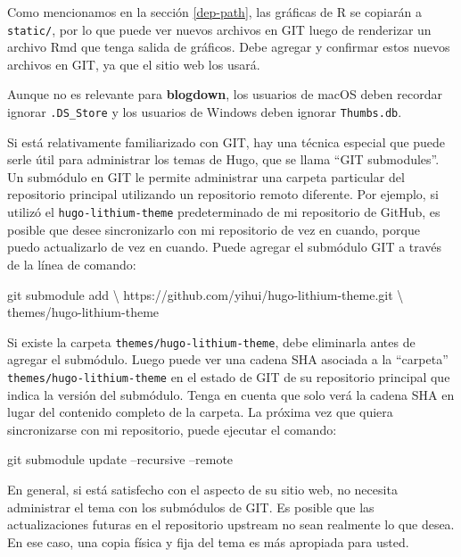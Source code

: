 \documentclass[12pt,]{krantz}
\makeatletter
\newenvironment{Shaded}{\begin{snugshade}}{\end{snugshade}}
\newcommand{\FunctionTok}[1]{\textcolor[rgb]{0.00,0.00,0.00}{#1}}
\newcommand{\NormalTok}[1]{#1}
\newenvironment{kframe}{%
\medskip{}
\setlength{\fboxsep}{.8em}
 \def\at@end@of@kframe{}%
 \ifinner\ifhmode%
  \def\at@end@of@kframe{\end{minipage}}%
  \begin{minipage}{\columnwidth}%
 \fi\fi%
 \def\FrameCommand##1{\hskip\@totalleftmargin \hskip-\fboxsep
 \colorbox{shadecolor}{##1}\hskip-\fboxsep
     \hskip-\linewidth \hskip-\@totalleftmargin \hskip\columnwidth}%
 \MakeFramed {\advance\hsize-\width
   \@totalleftmargin\z@ \linewidth\hsize
   \@setminipage}}%
 {\par\unskip\endMakeFramed%
 \at@end@of@kframe}
\renewenvironment{Shaded}{\begin{kframe}}{\end{kframe}}
\theoremstyle{definition}
\theoremstyle{definition}
\theoremstyle{definition}
\theoremstyle{remark}
\makeatother
\begin{document}
Como mencionamos en la sección \ref{dep-path}, las gráficas de R se
copiarán a \texttt{static/}, por lo que puede ver nuevos archivos en GIT
luego de renderizar un archivo Rmd que tenga salida de gráficos. Debe
agregar y confirmar estos nuevos archivos en GIT, ya que el sitio web
los usará.

Aunque no es relevante para \textbf{blogdown}, los usuarios de macOS
deben recordar ignorar \texttt{.DS\_Store} y los usuarios de Windows
deben ignorar \texttt{Thumbs.db}.

Si está relativamente familiarizado con GIT,
hay una técnica especial que puede serle útil para administrar los temas
de Hugo, que se llama ``GIT submodules''. Un submódulo en GIT le permite
administrar una carpeta particular del repositorio principal utilizando
un repositorio remoto diferente. Por ejemplo, si utilizó el
\texttt{hugo-lithium-theme} predeterminado de mi repositorio de GitHub,
es posible que desee sincronizarlo con mi repositorio de vez en cuando,
porque puedo actualizarlo de vez en cuando. Puede agregar el submódulo
GIT a través de la línea de comando:

\begin{Shaded}
\begin{Highlighting}[]
\FunctionTok{git}\NormalTok{ submodule add \textbackslash{}}
\NormalTok{  https://github.com/yihui/hugo-lithium-theme.git \textbackslash{}}
\NormalTok{  themes/hugo-lithium-theme}
\end{Highlighting}
\end{Shaded}

Si existe la carpeta \texttt{themes/hugo-lithium-theme}, debe eliminarla
antes de agregar el submódulo. Luego puede ver una cadena SHA asociada a
la ``carpeta'' \texttt{themes/hugo-lithium-theme} en el estado de GIT de
su repositorio principal que indica la versión del submódulo. Tenga en
cuenta que solo verá la cadena SHA en lugar del contenido completo de la
carpeta. La próxima vez que quiera sincronizarse con mi repositorio,
puede ejecutar el comando:

\begin{Shaded}
\begin{Highlighting}[]
\FunctionTok{git}\NormalTok{ submodule update --recursive --remote}
\end{Highlighting}
\end{Shaded}

En general, si está satisfecho con el aspecto de su sitio web, no
necesita administrar el tema con los submódulos de GIT. Es posible que
las actualizaciones futuras en el repositorio upstream no sean realmente
lo que desea. En ese caso, una copia física y fija del tema es más
apropiada para usted.
\end{document}

